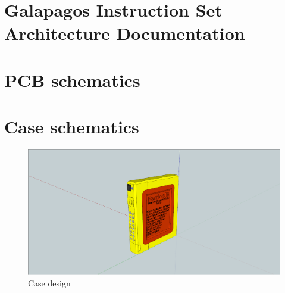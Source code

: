 \appendix
\chapter{Galapagos Instruction Set Architecture Documentation} \label{appendix:isa}
\newpage


\chapter{PCB schematics} \label{appendix:pcb-schematics}
\newpage



















\chapter{Case schematics} \label{appendix:case-schematics}
\newpage
\begin{figure}
\includegraphics[width=\textwidth,keepaspectratio,clip]{appendix/screen-shots/outer-shell.png}%
\caption{Case design}
\end{figure}

